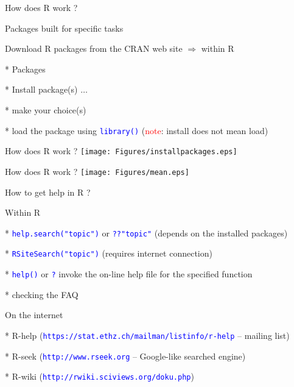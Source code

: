 \documentclass{presentatiesmetlogo}
\newcommand{\code}[1]{\textcolor{blue}{\texttt{#1}}}
\newcommand{\R}{{\textsf{R} }}
\let \nl = \newline
\begin{document}
\bitem
\item How does \R work ?
\bitemt
\item Packages built for specific tasks
\item Download \R packages from the CRAN web site $\Rightarrow$ within \R
\bitemt
\item[*] Packages
\item[*] Install package(s) $\ldots$
\item[*] make your choice(s)
\item[*] load the package using \code{library()} (\textcolor{red}{note}:
install does not mean load)
\eitemt
\eitemt
\eitem
\bitem
\item How does \R work ?
\eitem
\texttt{[image: Figures/installpackages.eps]}
\bitem
\item How does \R work ?
\eitem
\texttt{[image: Figures/mean.eps]}
\bitem
\item How to get help in \R ?
\bitemt
\item Within R
\bitemt
\item[*] \code{help.search("topic")} or \code{??"topic"} (depends on the
installed packages)
\item[*] \code{RSiteSearch("topic")} (requires internet connection)
\item[*] \code{help()} or \code{?} invoke the on-line help file for the
specified function
\item[*] checking the FAQ
\nl
\eitemt
\item On the internet
\bitemt
\item[*] \textsf{R}-help (\code{https://stat.ethz.ch/mailman/listinfo/r-help}
-- mailing list)
\item[*] \textsf{R}-seek (\code{http://www.rseek.org} -- Google-like
searched engine)
\item[*] \textsf{R}-wiki (\code{http://rwiki.sciviews.org/doku.php})
\eitemt
\eitemt
\eitem
\end{document}

